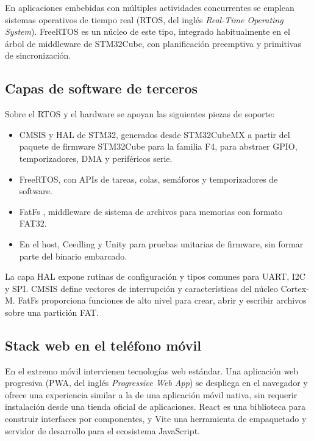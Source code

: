 En aplicaciones embebidas con múltiples actividades concurrentes se emplean sistemas operativos de tiempo real (RTOS, del inglés \textit{Real-Time Operating System}). FreeRTOS \citep{freertos} es un núcleo de este tipo, integrado habitualmente en el árbol de middleware de STM32Cube, con planificación preemptiva y primitivas de sincronización.

\subsection{Capas de software de terceros}

Sobre el RTOS y el hardware se apoyan las siguientes piezas de soporte:

\begin{itemize}
	\item CMSIS y HAL de STM32, generados desde STM32CubeMX a partir del paquete de firmware STM32Cube para la familia F4, para abstraer GPIO, temporizadores, DMA y periféricos serie.
	\item FreeRTOS, con APIs de tareas, colas, semáforos y temporizadores de software.
	\item FatFs \citep{chan_fatfs}, middleware de sistema de archivos para memorias con formato FAT32.
	\item En el host, Ceedling \citep{ceedling} y Unity \citep{unity} para pruebas unitarias de firmware, sin formar parte del binario embarcado.
\end{itemize}

La capa HAL expone rutinas de configuración y tipos comunes para UART, I2C y SPI. CMSIS define vectores de interrupción y características del núcleo Cortex-M. FatFs proporciona funciones de alto nivel para crear, abrir y escribir archivos sobre una partición FAT.

\subsection{Stack web en el teléfono móvil}

En el extremo móvil intervienen tecnologías web estándar. Una aplicación web progresiva (PWA, del inglés \textit{Progressive Web App}) \citep{mdn_pwa} se despliega en el navegador y ofrece una experiencia similar a la de una aplicación móvil nativa, sin requerir instalación desde una tienda oficial de aplicaciones. React \citep{react} es una biblioteca para construir interfaces por componentes, y Vite \citep{vite} una herramienta de empaquetado y servidor de desarrollo para el ecosistema JavaScript.

